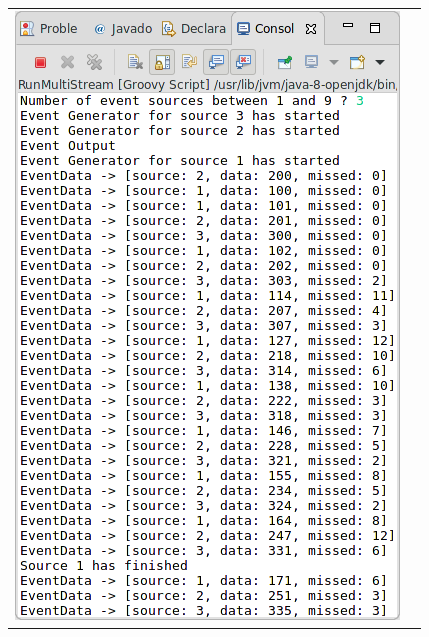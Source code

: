 \begin{tabular}{c|c}

	\includegraphics[width=\textwidth/2]{img/screenshots/9-3-3-1.png} &

\end{tabular}
